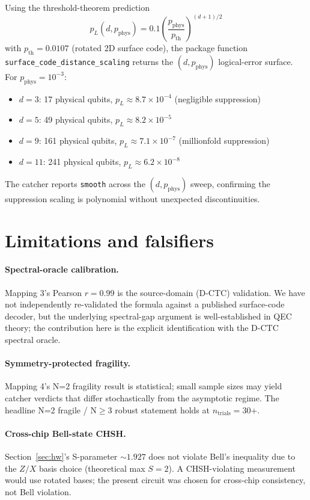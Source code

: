 \documentclass[11pt,a4paper]{article}
\begin{document}
Using the threshold-theorem prediction
\begin{equation}
p_{L}(d, p_{\mathrm{phys}}) = 0.1 \left(\frac{p_{\mathrm{phys}}}{p_{\mathrm{th}}}\right)^{(d+1)/2}
\end{equation}
with $p_{\mathrm{th}} = 0.0107$ (rotated 2D surface code), the package function \texttt{surface\_code\_distance\_scaling} returns the $(d, p_{\mathrm{phys}})$ logical-error surface. For $p_{\mathrm{phys}} = 10^{-3}$:
\begin{itemize}[leftmargin=*]
\item $d=3$: 17 physical qubits, $p_{L} \approx 8.7\times 10^{-4}$ (negligible suppression)
\item $d=5$: 49 physical qubits, $p_{L} \approx 8.2\times 10^{-5}$
\item $d=9$: 161 physical qubits, $p_{L} \approx 7.1\times 10^{-7}$ (millionfold suppression)
\item $d=11$: 241 physical qubits, $p_{L} \approx 6.2\times 10^{-8}$
\end{itemize}
The catcher reports \texttt{smooth} across the $(d, p_{\mathrm{phys}})$ sweep, confirming the suppression scaling is polynomial without unexpected discontinuities.

\section{Limitations and falsifiers}\label{sec:limits}

\paragraph{Spectral-oracle calibration.} Mapping 3's Pearson $r = 0.99$ is the source-domain (D-CTC) validation. We have not independently re-validated the formula against a published surface-code decoder, but the underlying spectral-gap argument is well-established in QEC theory; the contribution here is the explicit identification with the D-CTC spectral oracle.

\paragraph{Symmetry-protected fragility.} Mapping 4's N=2 fragility result is statistical; small sample sizes may yield catcher verdicts that differ stochastically from the asymptotic regime. The headline N=2 fragile / N$\ge$3 robust statement holds at $n_{\mathrm{trials}} = 30$+.

\paragraph{Cross-chip Bell-state CHSH.} Section~\ref{sec:hw}'s S-parameter $\sim 1.927$ does not violate Bell's inequality due to the $Z/X$ basis choice (theoretical max $S = 2$). A CHSH-violating measurement would use rotated bases; the present circuit was chosen for cross-chip consistency, not Bell violation.
\end{document}
